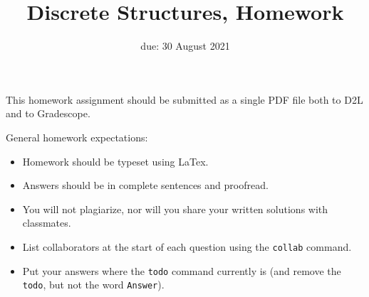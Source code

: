 \documentclass{article}
\title{Discrete Structures, Homework \hwnum}
\author{\todo{Your Name Here}}
\date{due: 30 August 2021}
\begin{document}
\maketitle

This homework assignment should be
submitted as a single PDF file both to D2L and to Gradescope.

General homework expectations:
\begin{itemize}
    \item Homework should be typeset using LaTex.
    \item Answers should be in complete sentences and proofread.
    \item You will not plagiarize, nor will you share your written solutions
        with classmates.
    \item List collaborators at the start of each question using the
        \texttt{collab} command.
    \item Put your answers where the \texttt{todo} command currently is (and
        remove the \texttt{todo}, but not the word \texttt{Answer}).
\end{itemize}

\end{document}
